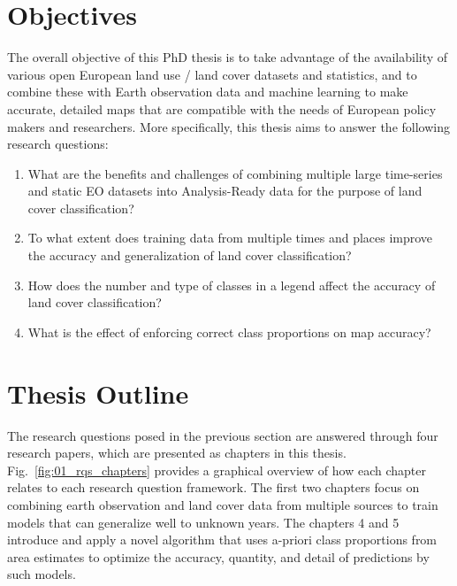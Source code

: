 \section{Objectives}
\label{sec:research_objectives}
The overall objective of this PhD thesis is to take advantage of the availability of various open European land use / land cover datasets and statistics, and to combine these with Earth observation data and machine learning to make accurate, detailed maps that are compatible with the needs of European policy makers and researchers. More specifically, this thesis aims to answer the following research questions:

\begin{enumerate}
\item %
What are the benefits and challenges of combining multiple large time-series and static EO datasets into Analysis-Ready data for the purpose of land cover classification?
\item %
To what extent does training data from multiple times and places improve the accuracy and generalization of land cover classification?
\item %
How does the number and type of classes in a legend affect the accuracy of land cover classification?
\item %
What is the effect of enforcing correct class proportions on map accuracy?
\end{enumerate}

\section{Thesis Outline}

The research questions posed in the previous section are answered through four research papers, which are presented as chapters in this thesis. Fig.\@~\ref{fig:01_rqs_chapters} provides a graphical overview of how each chapter relates to each research question framework. The first two chapters focus on combining earth observation and land cover data from multiple sources to train models that can generalize well to unknown years. The chapters 4 and 5 introduce and apply a novel algorithm that uses a-priori class proportions from area estimates to optimize the accuracy, quantity, and detail of predictions by such models.

